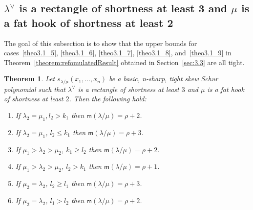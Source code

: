 \documentclass[10pt]{article}
\newtheorem{theorem}{Theorem}[section]
\theoremstyle{definition}
\newcommand{\msf}{\mathsf{m}}
\begin{document}
\subsection{\texorpdfstring{$\lambda^\vee$}{lambda vee} is a rectangle of shortness at least 3 and \texorpdfstring{$\mu$}{mu} is a fat hook of shortness at least 2}

The goal of this subsection is to show that the upper bounds for cases~\ref{theo3.1_5}, \ref{theo3.1_6}, \ref{theo3.1_7}, \ref{theo3.1_8}, and~\ref{theo3.1_9} in Theorem~\ref{theorem:refomulatedResult} obtained in Section~\ref{sec:3.3} are all tight.

\begin{theorem}
\label{thm:necessaryshort3}
Let $s_{\lambda/\mu}(x_1,\ldots,x_n)$ be a basic, n-sharp, tight skew Schur polynomial such that $\lambda^\vee$ is a rectangle of shortness at least $3$ and $\mu$ is a fat hook of shortness at least $2$. Then the following hold:
\begin{enumerate}[label=(\Roman*)]
 \item\label{theo4.6_1} If $\lambda_2 = \mu_1, l_2 > k_1$ then $\msf (\lambda/\mu) = \rho+2$.
 \item\label{theo4.6_2} If $\lambda_2 = \mu_1$, $l_2 \leq k_1$ then $\msf (\lambda/\mu) = \rho+3$.
 \item\label{theo4.6_3} If $\mu_1 > \lambda_2 > \mu_2$, $k_1 \geq l_2$ then $\msf (\lambda/\mu) = \rho+2$.
 \item\label{theo4.6_4} If $\mu_1 > \lambda_2 > \mu_2$, $l_2 > k_1$ then $\msf (\lambda/\mu) = \rho+1$.
 \item\label{theo4.6_5} If $\mu_2 = \lambda_2$, $l_2 \geq l_1$ then $\msf (\lambda/\mu) = \rho+3$.
 \item\label{theo4.6_6} If $\mu_2 = \lambda_2$, $l_1 > l_2$ then $\msf (\lambda/\mu) = \rho+2$.
\end{enumerate}
\end{theorem}
\end{document}
